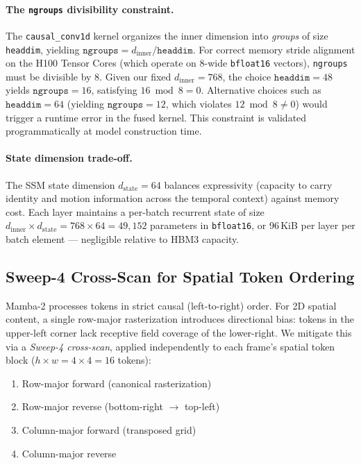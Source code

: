 \documentclass[12pt,letterpaper]{report}
\begin{document}
\paragraph{The \texttt{ngroups} divisibility constraint.}
The \texttt{causal\_conv1d} kernel organizes the inner dimension into
\emph{groups} of size \texttt{headdim}, yielding
$\texttt{ngroups} = d_{\mathrm{inner}} / \texttt{headdim}$. For correct
memory stride alignment on the H100 Tensor Cores (which operate on 8-wide
\texttt{bfloat16} vectors), \texttt{ngroups} must be divisible by 8. Given our
fixed $d_{\mathrm{inner}} = 768$, the choice $\texttt{headdim} = 48$ yields
$\texttt{ngroups} = 16$, satisfying $16 \bmod 8 = 0$. Alternative choices
such as $\texttt{headdim} = 64$ (yielding $\texttt{ngroups} = 12$, which
violates $12 \bmod 8 \neq 0$) would trigger a runtime error in the fused
kernel. This constraint is validated programmatically at model construction
time. %

\paragraph{State dimension trade-off.}
The SSM state dimension $d_{\mathrm{state}} = 64$ balances expressivity
(capacity to carry identity and motion information across the temporal context)
against memory cost. Each layer maintains a per-batch recurrent state of size
$d_{\mathrm{inner}} \times d_{\mathrm{state}} = 768 \times 64 = 49{,}152$
parameters in \texttt{bfloat16}, or 96\,KiB per layer per batch element ---
negligible relative to HBM3 capacity. %

\subsection{Sweep-4 Cross-Scan for Spatial Token Ordering}\label{subsec:cross-scan}

Mamba-2 processes tokens in strict causal (left-to-right) order. For 2D
spatial content, a single row-major rasterization introduces directional bias:
tokens in the upper-left corner lack receptive field coverage of the
lower-right. We mitigate this via a \emph{Sweep-4 cross-scan}, applied
independently to each frame's spatial token block ($h \times w = 4 \times 4 =
16$ tokens): %

\begin{enumerate}
    \item Row-major forward (canonical rasterization)
    \item Row-major reverse (bottom-right $\rightarrow$ top-left)
    \item Column-major forward (transposed grid)
    \item Column-major reverse
\end{enumerate}
\end{document}
